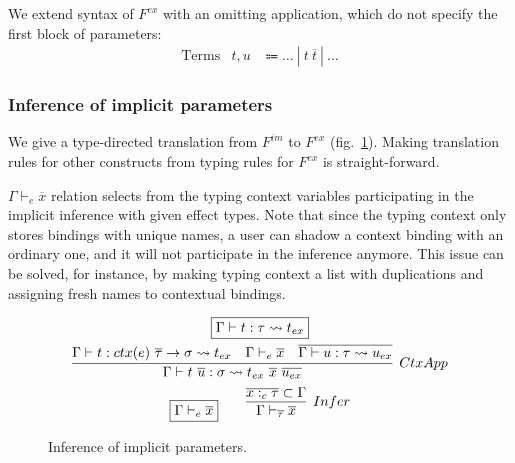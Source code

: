 \documentclass[acmsmall]{acmart}
\newcommand{\mathframebox}[1]{\framebox{$\displaystyle #1$}}
\newcommand{\vor}{~|~}
\newcommand{\ap}{~}
\newcommand{\ctx}[1]{ctx(#1)~}
\newcommand{\step}{\rightsquigarrow}
\begin{document}
We extend syntax of $F^{ex}$ with an omitting application, which do not specify the first block of parameters:
\[
    \begin{array}{lcc}
        \text{Terms} & t, u &\Coloneqq \ldots \vor t\ap\overline{t} \vor \ldots
    \end{array}
\]

\subsubsection{Inference of implicit parameters} \label{subsubsec:inference}

We give a type-directed translation from $F^{im}$ to $F^{ex}$ (fig.\ \ref{fig:fim-fex-inference}).
Making translation rules for other constructs from typing rules for $F^{ex}$ is straight-forward.

$\Gamma\vdash_e \overline{x}$ relation selects from the typing context variables participating in the implicit inference with given effect types.
Note that since the typing context only stores bindings with unique names, a user can shadow a context binding with an ordinary one, and it will not participate in the inference anymore.
This issue can be solved, for instance, by making typing context a list with duplications and assigning fresh names to contextual bindings.

\begin{figure}
    \begin{gather*}
        \mathframebox{\Gamma\vdash t : \tau \step t_{ex}} \\
        \infer[CtxApp]{
            \Gamma\vdash t\ap\overline{u} : \sigma \step t_{ex} \ap \overline{x}\ap\overline{u_{ex}}
        }{
            \Gamma\vdash t : \ctx{e} \overline{\tau} \to \sigma \step t_{ex} &
            \Gamma\vdash_e\overline{x} &
            \overline{\Gamma\vdash u : \tau \step u_{ex}}
        } \\
        \mathframebox{\Gamma\vdash_e \overline{x}}
        \text{\hspace{2em}}
        \infer[Infer]{\Gamma\vdash_{\overline{\tau}} \overline{x}}{\overline{x :_c \tau}\subset \Gamma}
    \end{gather*}
    \caption{Inference of implicit parameters.}
    \label{fig:fim-fex-inference}
\end{figure}
\end{document}
